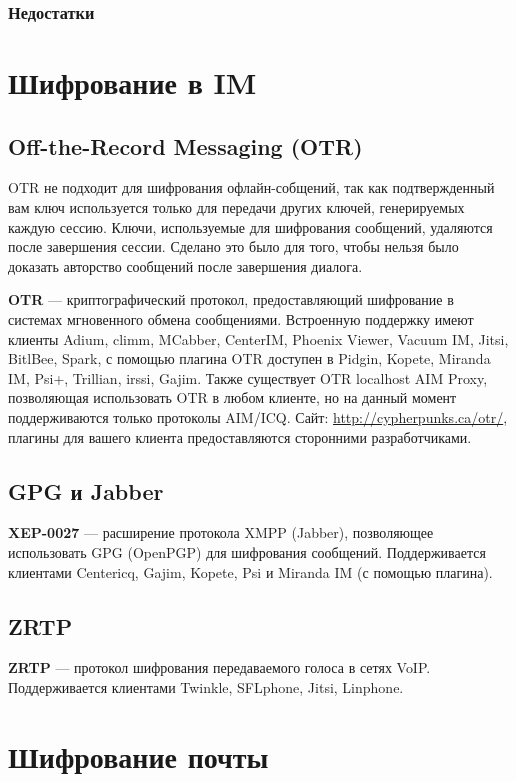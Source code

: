\subsubsection{Недостатки}

\section{Шифрование в IM}
\subsection{Off-the-Record Messaging (OTR)}
\begin{important}
OTR не подходит для шифрования офлайн-собщений, так как подтвержденный вам ключ используется только для передачи других ключей, генерируемых каждую сессию. Ключи, используемые для шифрования сообщений, удаляются после завершения сессии. Сделано это было для того, чтобы нельзя было доказать авторство сообщений после завершения диалога.
\end{important}
\textbf{OTR} --- криптографический протокол, предоставляющий шифрование в системах мгновенного обмена сообщениями. Встроенную поддержку имеют клиенты Adium, climm, MCabber, CenterIM, Phoenix Viewer, Vacuum IM, Jitsi, BitlBee, Spark, с помощью плагина OTR доступен в Pidgin\cite{otr-pidgin}, Kopete\cite{otr-kopete}, Miranda IM\cite{otr-miranda}, Psi+\cite{otr-psi}, Trillian\cite{otr-trillian}, irssi\cite{otr-irssi}, Gajim\cite{otr-gajim}. Также существует OTR localhost AIM Proxy, позволяющая использовать OTR в любом клиенте, но на данный момент поддерживаются только протоколы AIM/ICQ. Сайт: \url{http://cypherpunks.ca/otr/}, плагины для вашего клиента предоставляются сторонними разработчиками.
\subsection{GPG и Jabber}
\textbf{XEP-0027} --- расширение протокола XMPP (Jabber), позволяющее использовать GPG (OpenPGP) для шифрования сообщений\cite{xep-0027}. Поддерживается клиентами Centericq, Gajim, Kopete, Psi и Miranda IM (с помощью плагина).
\subsection{ZRTP}
\textbf{ZRTP} --- протокол шифрования передаваемого голоса в сетях VoIP. Поддерживается клиентами Twinkle, SFLphone, Jitsi, Linphone.

\section{Шифрование почты}
